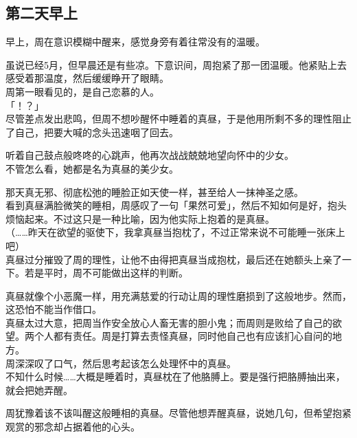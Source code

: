 \subsection{第二天早上}

早上，周在意识模糊中醒来，感觉身旁有着往常没有的温暖。

虽说已经5月，但早晨还是有些凉。下意识间，周抱紧了那一团温暖。他紧贴上去感受着那温度，然后缓缓睁开了眼睛。\\

周第一眼看见的，是自己恋慕的人。\\

「！？」\\

尽管差点发出悲鸣，但周不想吵醒怀中睡着的真昼，于是他用所剩不多的理性阻止了自己，把要大喊的念头迅速咽了回去。

听着自己鼓点般咚咚的心跳声，他再次战战兢兢地望向怀中的少女。\\

不管怎么看，她都是名为真昼的美少女。

那天真无邪、彻底松弛的睡脸正如天使一样，甚至给人一抹神圣之感。\\

看到真昼满脸微笑的睡相，周感叹了一句「果然可爱」，然后不知如何是好，抱头烦恼起来。不过这只是一种比喻，因为他实际上抱着的是真昼。\\

（……昨天在欲望的驱使下，我拿真昼当抱枕了，不过正常来说不可能睡一张床上吧）\\

真昼过分摧毁了周的理性，让他不由得把真昼当成抱枕，最后还在她额头上亲了一下。若是平时，周不可能做出这样的判断。

真昼就像个小恶魔一样，用充满慈爱的行动让周的理性磨损到了这般地步。然而，这恐怕不能当作借口。\\

真昼太过大意，把周当作安全放心人畜无害的胆小鬼；而周则是败给了自己的欲望。两个人都有责任。周是打算去责怪真昼，同时他自己也有应该扪心自问的地方。\\

周深深叹了口气，然后思考起该怎么处理怀中的真昼。\\

不知什么时候……大概是睡着时，真昼枕在了他胳膊上。要是强行把胳膊抽出来，就会把她弄醒。

周犹豫着该不该叫醒这般睡相的真昼。尽管他想弄醒真昼，说她几句，但希望抱紧观赏的邪念却占据着他的心头。\\

